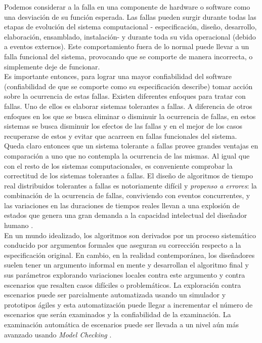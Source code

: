 \documentclass[titlepage, 12pt]{book}
\begin{document}
Podemos considerar a la falla en una componente de hardware o software como una desviaci\'on de su funci\'on esperada. Las fallas pueden surgir durante todas las etapas de evoluci\'on del sistema computacional - especificaci\'on, dise\~no, desarrollo, elaboraci\'on, ensamblado, instalaci\'on- y durante toda su vida operacional \cite{faultInjection} (debido a eventos externos). Este comportamiento fuera de lo normal puede llevar a un falla funcional del sistema, provocando que se comporte de manera incorrecta, o simplemente deje de funcionar.\\
Es importante entonces, para lograr una mayor confiabilidad del software (confiabilidad de que se comporte como su especificaci\'on describe) tomar acci\'on sobre la ocurrencia de estas fallas. Existen diferentes enfoques para tratar con fallas. Uno de ellos es elaborar sistemas tolerantes a fallas. A diferencia de otros enfoques en los que se busca eliminar o disminuir la ocurrencia de fallas, en estos sistemas se busca disminuir los efectos de las fallas y en el mejor de los casos recuperarse de estos y evitar que acarreen en fallas funcionales del sistema.\\

Queda claro entonces que un sistema tolerante a fallas provee grandes ventajas en comparaci\'on a uno que no contempla la ocurrencia de las mismas. Al igual que con el resto de los sistemas computacionales, es conveniente comprobar la correctitud de los sistemas tolerantes a fallas.
El dise\~no de algoritmos de tiempo real distribuidos tolerantes a fallas es notoriamente dif\'icil y \emph{propenso a errores}: la combinaci\'on de la ocurrencia de fallas, conviviendo con eventos concurrentes, y las variaciones en las duraciones de tiempos reales llevan a una explosi\'on de estados que genera una gran demanda a la capacidad intelectual del dise\~nador humano \cite{SteinerRushby}.\\

En un mundo idealizado, los algoritmos son derivados por un proceso sistem\'atico conducido por argumentos formales que aseguran su correcci\'on respecto a la especificaci\'on original. En cambio, en la realidad contempor\'anea, los dise\~nadores suelen tener un argumento informal en mente y desarrollan el algoritmo final y sus par\'ametros explorando variaciones locales contra este argumento y contra escenarios que resalten casos dif\'iciles o problem\'aticos. La exploraci\'on contra escenarios puede ser parcialmente automatizada usando un simulador y prototipos \'agiles y esta automatizaci\'on puede llegar a incrementar el n\'umero de escenarios que ser\'an examinados y la confiabilidad de la examinaci\'on. La examinaci\'on autom\'atica de escenarios puede ser llevada a un nivel a\'un m\'as avanzado usando \emph{Model Checking} \cite{SteinerRushby}.\\
\end{document}
